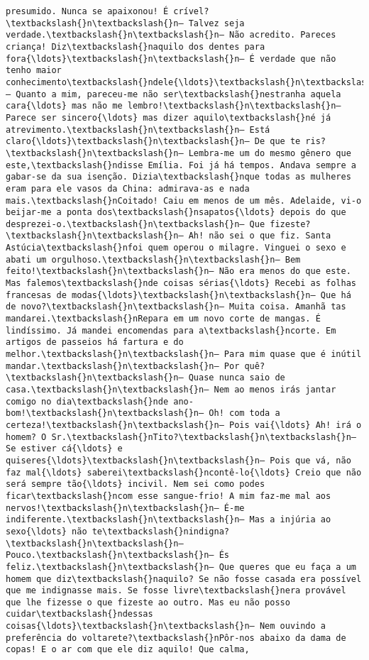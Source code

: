 \documentclass[11pt]{article}
\begin{document}
\begin{Verbatim}[commandchars=\\\{\}]
presumido. Nunca se apaixonou! É crível?\textbackslash{}n\textbackslash{}n— Talvez seja verdade.\textbackslash{}n\textbackslash{}n— Não acredito. Pareces criança! Diz\textbackslash{}naquilo dos dentes para fora{\ldots}\textbackslash{}n\textbackslash{}n— É verdade que não tenho maior conhecimento\textbackslash{}ndele{\ldots}\textbackslash{}n\textbackslash{}n— Quanto a mim, pareceu-me não ser\textbackslash{}nestranha aquela cara{\ldots} mas não me lembro!\textbackslash{}n\textbackslash{}n— Parece ser sincero{\ldots} mas dizer aquilo\textbackslash{}né já atrevimento.\textbackslash{}n\textbackslash{}n— Está claro{\ldots}\textbackslash{}n\textbackslash{}n— De que te ris?\textbackslash{}n\textbackslash{}n— Lembra-me um do mesmo gênero que este,\textbackslash{}ndisse Emília. Foi já há tempos. Andava sempre a gabar-se da sua isenção. Dizia\textbackslash{}nque todas as mulheres eram para ele vasos da China: admirava-as e nada mais.\textbackslash{}nCoitado! Caiu em menos de um mês. Adelaide, vi-o beijar-me a ponta dos\textbackslash{}nsapatos{\ldots} depois do que desprezei-o.\textbackslash{}n\textbackslash{}n— Que fizeste?\textbackslash{}n\textbackslash{}n— Ah! não sei o que fiz. Santa Astúcia\textbackslash{}nfoi quem operou o milagre. Vinguei o sexo e abati um orgulhoso.\textbackslash{}n\textbackslash{}n— Bem feito!\textbackslash{}n\textbackslash{}n— Não era menos do que este. Mas falemos\textbackslash{}nde coisas sérias{\ldots} Recebi as folhas francesas de modas{\ldots}\textbackslash{}n\textbackslash{}n— Que há de novo?\textbackslash{}n\textbackslash{}n— Muita coisa. Amanhã tas mandarei.\textbackslash{}nRepara em um novo corte de mangas. É lindíssimo. Já mandei encomendas para a\textbackslash{}ncorte. Em artigos de passeios há fartura e do melhor.\textbackslash{}n\textbackslash{}n— Para mim quase que é inútil mandar.\textbackslash{}n\textbackslash{}n— Por quê?\textbackslash{}n\textbackslash{}n— Quase nunca saio de casa.\textbackslash{}n\textbackslash{}n— Nem ao menos irás jantar comigo no dia\textbackslash{}nde ano-bom!\textbackslash{}n\textbackslash{}n— Oh! com toda a certeza!\textbackslash{}n\textbackslash{}n— Pois vai{\ldots} Ah! irá o homem? O Sr.\textbackslash{}nTito?\textbackslash{}n\textbackslash{}n— Se estiver cá{\ldots} e quiseres{\ldots}\textbackslash{}n\textbackslash{}n— Pois que vá, não faz mal{\ldots} saberei\textbackslash{}ncontê-lo{\ldots} Creio que não será sempre tão{\ldots} incivil. Nem sei como podes ficar\textbackslash{}ncom esse sangue-frio! A mim faz-me mal aos nervos!\textbackslash{}n\textbackslash{}n— É-me indiferente.\textbackslash{}n\textbackslash{}n— Mas a injúria ao sexo{\ldots} não te\textbackslash{}nindigna?\textbackslash{}n\textbackslash{}n— Pouco.\textbackslash{}n\textbackslash{}n— És feliz.\textbackslash{}n\textbackslash{}n— Que queres que eu faça a um homem que diz\textbackslash{}naquilo? Se não fosse casada era possível que me indignasse mais. Se fosse livre\textbackslash{}nera provável que lhe fizesse o que fizeste ao outro. Mas eu não posso cuidar\textbackslash{}ndessas coisas{\ldots}\textbackslash{}n\textbackslash{}n— Nem ouvindo a preferência do voltarete?\textbackslash{}nPôr-nos abaixo da dama de copas! E o ar com que ele diz aquilo! Que calma, 
\end{Verbatim}
\end{document}
